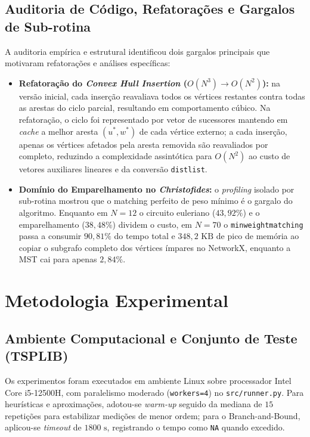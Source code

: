 \documentclass[12pt,a4paper]{article}
\renewcommand{\_}{\origunderscore\hspace{0pt}}
\begin{document}
\subsection{Auditoria de Código, Refatorações e Gargalos de Sub-rotina}
A auditoria empírica e estrutural identificou dois gargalos principais que motivaram refatorações e análises específicas:
\begin{itemize}
    \item \textbf{Refatoração do \textit{Convex Hull Insertion} ($O(N^3) \to O(N^2)$):} na versão inicial, cada inserção reavaliava todos os vértices restantes contra todas as arestas do ciclo parcial, resultando em comportamento cúbico. Na refatoração, o ciclo foi representado por vetor de sucessores mantendo em \textit{cache} a melhor aresta $(u^*, w^*)$ de cada vértice externo; a cada inserção, apenas os vértices afetados pela aresta removida são reavaliados por completo, reduzindo a complexidade assintótica para $O(N^2)$ ao custo de vetores auxiliares lineares e da conversão \texttt{dist\_list}.
    \item \textbf{Domínio do Emparelhamento no \textit{Christofides}:} o \textit{profiling} isolado por sub-rotina mostrou que o matching perfeito de peso mínimo é o gargalo do algoritmo. Enquanto em $N=12$ o circuito euleriano ($43{,}92\%$) e o emparelhamento ($38{,}48\%$) dividem o custo, em $N=70$ o \texttt{min\_weight\_matching} passa a consumir $90{,}81\%$ do tempo total e \textbf{$348{,}2\text{ KB}$} de pico de memória ao copiar o subgrafo completo dos vértices ímpares no NetworkX, enquanto a MST cai para apenas $2{,}84\%$.
\end{itemize}

\section{Metodologia Experimental}

\subsection{Ambiente Computacional e Conjunto de Teste (TSPLIB)}
Os experimentos foram executados em ambiente Linux sobre processador Intel Core i5-12500H, com paralelismo moderado (\texttt{workers=4}) no \texttt{src/runner.py}. Para heurísticas e aproximações, adotou-se \textit{warm-up} seguido da mediana de $15$ repetições para estabilizar medições de menor ordem; para o Branch-and-Bound, aplicou-se \textit{timeout} de $1800\text{ s}$, registrando o tempo como \texttt{NA} quando excedido.
\end{document}
